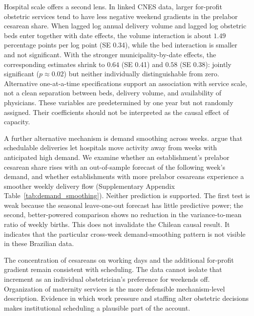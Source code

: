 \documentclass[12pt]{article}
\newcommand{\satab}[1]{Supplementary Appendix Table~\ref{#1}}
\begin{document}
Hospital scale offers a second lens. In linked CNES data, larger for-profit obstetric services tend to have less negative weekend gradients in the prelabor cesarean share. When lagged log annual delivery volume and lagged log obstetric beds enter together with date effects, the volume interaction is about $1.49$ percentage points per log point (SE 0.34), while the bed interaction is smaller and not significant. With the stronger municipality-by-date effects, the corresponding estimates shrink to $0.64$ (SE 0.41) and $0.58$ (SE 0.38): jointly significant ($p \approx 0.02$) but neither individually distinguishable from zero. Alternative one-at-a-time specifications support an association with service scale, not a clean separation between beds, delivery volume, and availability of physicians. These variables are predetermined by one year but not randomly assigned. Their coefficients should not be interpreted as the causal effect of capacity.

A further alternative mechanism is demand smoothing across weeks. \citet{elejalde2021} argue that schedulable deliveries let hospitals move activity away from weeks with anticipated high demand. We examine whether an establishment's prelabor cesarean share rises with an out-of-sample forecast of the following week's demand, and whether establishments with more prelabor cesareans experience a smoother weekly delivery flow (\satab{tab:demand_smoothing}). Neither prediction is supported. The first test is weak because the seasonal leave-one-out forecast has little predictive power; the second, better-powered comparison shows no reduction in the variance-to-mean ratio of weekly births. This does not invalidate the Chilean causal result. It indicates that the particular cross-week demand-smoothing pattern is not visible in these Brazilian data.

The concentration of cesareans on working days and the additional for-profit gradient remain consistent with scheduling. The data cannot isolate that increment as an individual obstetrician's preference for weekends off. Organization of maternity services is the more defensible mechanism-level description. Evidence in which work pressure and staffing alter obstetric decisions \citep{maibom2021,facchini2022,bachner2024,bensnes2026} makes institutional scheduling a plausible part of the account.



\end{document}
